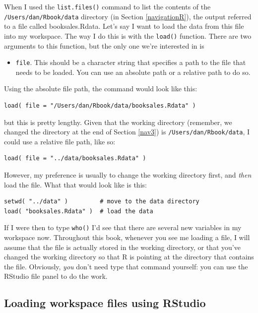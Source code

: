 \documentclass[
]{book}
\providecommand{\tightlist}{%
  \setlength{\itemsep}{0pt}\setlength{\parskip}{0pt}}
\begin{document}
When I used the \texttt{list.files()} command to list the contents of the \texttt{/Users/dan/Rbook/data} directory (in Section \ref{navigationR}), the output referred to a file called booksales.Rdata. Let's say I want to load the data from this file into my workspace. The way I do this is with the \texttt{load()} function. There are two arguments to this function, but the only one we're interested in is

\begin{itemize}
\tightlist
\item
  \texttt{file}. This should be a character string that specifies a path to the file that needs to be loaded. You can use an absolute path or a relative path to do so.
\end{itemize}

Using the absolute file path, the command would look like this:

\begin{verbatim}
load( file = "/Users/dan/Rbook/data/booksales.Rdata" )
\end{verbatim}

but this is pretty lengthy. Given that the working directory (remember, we changed the directory at the end of Section \ref{nav3}) is \texttt{/Users/dan/Rbook/data}, I could use a relative file path, like so:

\begin{verbatim}
load( file = "../data/booksales.Rdata" )
\end{verbatim}

However, my preference is usually to change the working directory first, and \emph{then} load the file. What that would look like is this:

\begin{verbatim}
setwd( "../data" )         # move to the data directory
load( "booksales.Rdata" )  # load the data
\end{verbatim}

If I were then to type \texttt{who()} I'd see that there are several new variables in my workspace now. Throughout this book, whenever you see me loading a file, I will assume that the file is actually stored in the working directory, or that you've changed the working directory so that R is pointing at the directory that contains the file. Obviously, \emph{you} don't need type that command yourself: you can use the RStudio file panel to do the work.

\hypertarget{loading-workspace-files-using-rstudio}{%
\subsection{Loading workspace files using RStudio}\label{loading-workspace-files-using-rstudio}}
\end{document}
